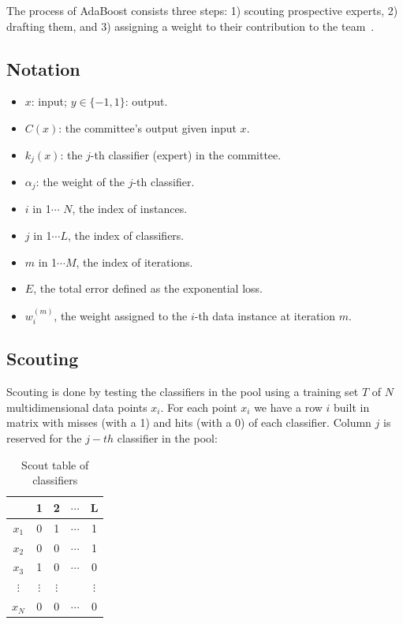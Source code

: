 \documentclass[]{article}  %
\begin{document}
The process of AdaBoost consists three steps: 1) scouting prospective experts, 2) drafting them, and 3) assigning a weight to their contribution to the team~\cite{tutorial}.

\subsection{Notation}
\begin{itemize}
\item $x$: input; $y \in \{-1,1\}$: output.
\item $C(x)$: the committee's output given input $x$.
\item $k_j(x)$: the $j$-th classifier (expert) in the committee.
\item $\alpha_j$: the weight of the $j$-th classifier.
\item $i$ in 1$\cdots$ $N$, the index of instances.
\item $j$ in 1$\cdots L$, the index of classifiers.
\item $m$ in 1$\cdots M$, the index of iterations.
\item $E$, the total error defined as the exponential loss.
\item $w_i^{(m)}$, the weight assigned to the $i$-th data instance at iteration $m$.
\end{itemize}

\subsection{Scouting}
Scouting is done by testing the classifiers in the pool using a training set $T$ of $N$ multidimensional data points $x_i$. For each point $x_i$ we have a row $i$ built in matrix with misses (with a 1) and hits (with a 0) of each classifier. Column $j$ is reserved for the $j-th$ classifier in the pool:

\begin{table}[htdp]
\caption{Scout table of classifiers}
\begin{center}
\begin{tabular}{c|cccc}
 & 1 & 2 & $\cdots$ & L\\
 \hline
$x_1$ & 0 & 1 & $\cdots$ & 1\\
$x_2$ & 0 & 0 & $\cdots$ & 1\\
$x_3$ & 1 & 0 & $\cdots$ & 0\\
$\vdots$ & $\vdots$ & $\vdots$ &  & $\vdots$ \\
$x_N$ & 0 & 0 & $\cdots$ & 0
\end{tabular}
\end{center}
\label{default}
\end{table}%
\end{document}
